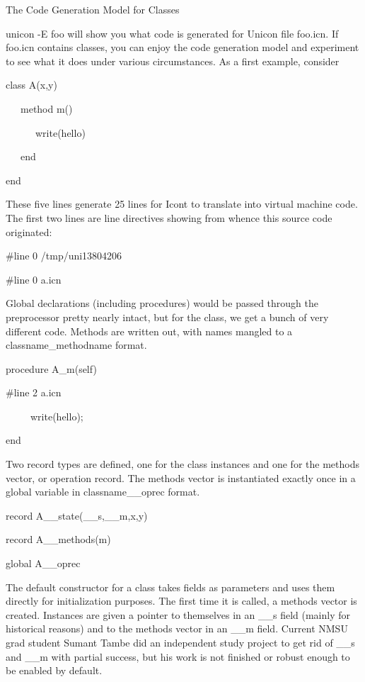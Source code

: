 {\sffamily
The Code Generation Model for Classes }


{\textquotedbl}unicon -E foo{\textquotedbl} will show you what code is
generated for Unicon file foo.icn. If foo.icn contains classes, you
can enjoy the code generation model and experiment to see what it does
under various circumstances. As a first example, consider

{\ttfamily\mdseries
class A(x,y)}

{\ttfamily\mdseries
\ \ \ method m()}

{\ttfamily\mdseries
\ \ \ \ \ \ write({\textquotedbl}hello{\textquotedbl})}

{\ttfamily\mdseries
\ \ \ end}

{\ttfamily\mdseries
end}


These five lines generate 25 lines for Icont to translate into virtual
machine code. The first two lines are line directives showing from
whence this source code originated:

{\ttfamily\mdseries
\#line 0 {\textquotedbl}/tmp/uni13804206{\textquotedbl}}

{\ttfamily\mdseries
\#line 0 {\textquotedbl}a.icn{\textquotedbl}}


Global declarations (including procedures) would be passed through the
preprocessor pretty nearly intact, but for the class, we get a bunch
of very different code. Methods are written out, with names mangled to
a classname\_methodname format.

{\ttfamily\mdseries
procedure A\_m(self)}


\bigskip


\bigskip

{\ttfamily\mdseries
\#line 2 {\textquotedbl}a.icn{\textquotedbl}}

{\ttfamily\mdseries
\ \ \ \ \ write({\textquotedbl}hello{\textquotedbl});}

{\ttfamily\mdseries
end}


Two record types are defined, one for the class instances and one for
the {\textquotedbl}methods vector{\textquotedbl}, or
{\textquotedbl}operation record{\textquotedbl}. The methods vector is
instantiated exactly once in a global variable in classname\_\_oprec
format.

{\ttfamily\mdseries
record A\_\_state(\_\_s,\_\_m,x,y)}

{\ttfamily\mdseries
record A\_\_methods(m)}

{\ttfamily\mdseries
global A\_\_oprec}


The default constructor for a class takes fields as parameters and
uses them directly for initialization purposes. The first time it is
called, a methods vector is created. Instances are given a pointer to
themselves in an \_\_s field (mainly for historical reasons) and to
the methods vector in an \_\_m field. Current NMSU grad student Sumant
Tambe did an independent study project to get rid of \_\_s and \_\_m
with partial success, but his work is not finished or robust enough to
be enabled by default.

